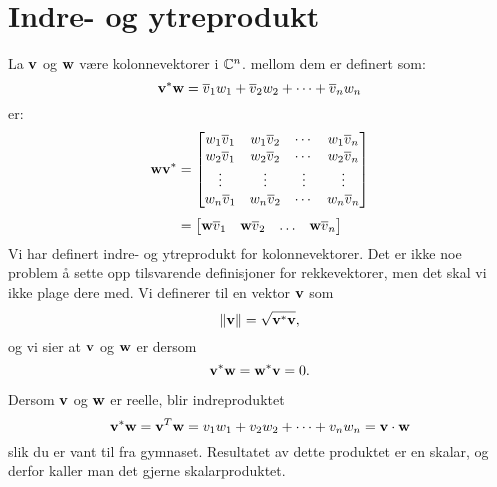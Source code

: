 \section*{Indre- og ytreprodukt}
La $\mathbf{v}$ og $\mathbf{w}$ være kolonnevektorer i $\mathbb{C}^n$. 
 mellom dem er definert som:
\[
\mathbf{v}^* \mathbf{w}= \overline v_1 w_1 + \overline v_2 w_2 + \cdots +\overline v_n w_n
 \] 
  er:
\begin{align*}
 \mathbf{w} \mathbf{v}^*&=
\begin{bmatrix}
w_1 \overline v_1       & w_1 \overline v_2             & \cdots & w_1 \overline v_n \\
w_2 \overline v_1     & w_2 \overline v_2              & \cdots & w_2 \overline v_n   \\
\vdots & \vdots & \vdots  & \vdots \\
w_n \overline v_1     & w_n \overline v_2              & \cdots & w_n \overline v_n   \\
\end{bmatrix}
\\[3pt]&=
\begin{bmatrix}
\mathbf{w}  \overline v_1 & \mathbf{w} \overline v_2  & \hdots & \mathbf{w} \overline v_n 
\end{bmatrix}
 \end{align*}  
 Vi har definert indre- og ytreprodukt for kolonnevektorer. 
 Det er ikke noe problem å sette opp tilsvarende definisjoner for rekkevektorer, 
 men det skal vi ikke plage dere med. 
 Vi definerer  til en vektor $\mathbf{v}$ som 
 \[
 \|\mathbf{v}\|=\sqrt{\mathbf{v}^*\mathbf{v}},
 \]
 og vi sier at $\mathbf{v}$ og $\mathbf{w}$ er  dersom 
\[
 \mathbf{v}^*\mathbf{w}=\mathbf{w}^*\mathbf{v} = 0.
 \] 
 

 
 \begin{merkx}
 Dersom $\mathbf{v}$ og $\mathbf{w}$ er reelle, blir indreproduktet 
\[
\mathbf{v}^* \mathbf{w}=\mathbf{v}^T\mathbf{w}= v_1w_1 + v_2w_2 + \cdots +v_nw_n=\mathbf{v}\cdot  \mathbf{w}
 \] 
 slik du er vant til fra gymnaset. Resultatet av dette produktet er en skalar, og derfor kaller man det gjerne skalarproduktet.  
 \end{merkx}
 
